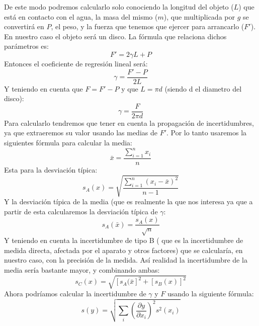 \documentclass[10pt,a4paper]{article}
\begin{document}
De este modo podremos calcularlo solo conociendo la longitud del objeto ($L$) que está en contacto con el agua, la masa del mismo ($m$), que multiplicada por $g$ se convertirá en $P$, el peso, y la fuerza que tenemos que ejercer para arrancarlo ($F'$). En nuestro caso el objeto será un disco. La fórmula que relaciona dichos parámetros es: 
\begin{equation}
F'= 2 \gamma L + P \label{Fuerza de tensión superficial}
\end{equation}
Entonces el coeficiente de regresión lineal será:
\begin{equation}
\gamma = \dfrac{F'-P}{2L} \label{Valor de gamma 1}
\end{equation}
Y teniendo en cuenta que $F=F'-P$ y que $L=\pi d$ (siendo d el diametro del disco):
\begin{equation}
\gamma = \dfrac{F}{2\pi d} \label{Valor de gamma 2}
\end{equation}
Para calcularlo tendremos que tener en cuenta la propagación de incertidumbres, ya que extraeremos su valor usando las medias de $F'$. Por lo tanto usaremos la siguientes fórmula para calcular la media:
\begin{equation}  
\bar{x} = \dfrac{\sum_{i=1}^{n} x_i}{n} \label{media aritmetica}
\end{equation}
Esta para la desviación típica:
\begin{equation}
s_A(x)=\sqrt{\dfrac{\sum_{i=1}^n (x_i-\bar{x})^2}{n-1}} \label{desviación típica de los datos en una media}
\end{equation}
Y la desviación típica de la media (que es realmente la que nos interesa ya que a partir de esta calcularemos la desviación típica de $\gamma$:
\begin{equation}
s_A(\bar{x})=\dfrac{s_A(x)}{\sqrt{n}} \label{Desviación estandar de la media}
\end{equation}
Y teniendo en cuenta la incertidumbre de tipo B (	que es la incertidumbre de medida directa, afectada por el aparato y otros factores) que se calcularía, en nuestro caso, con la precisión de la medida. Así realidad la incertidumbre de la media sería bastante mayor, y combinando ambas:
\begin{equation}
s_C(x) = \sqrt{[s_A(\bar{x}]^2+[s_B(x)]^2} \label{incertidumbre combinada}
\end{equation}
Ahora podríamos calcular la incertidumbre de $\gamma$ y $F$ usando la siguiente fórmula:
\begin{equation}
s(y)=\sqrt{\sum_i (\dfrac{\partial y}{\partial x_i})^2s^2(x_i)} \label{propagación de inciertidumbres}
\end{equation}
\end{document}
